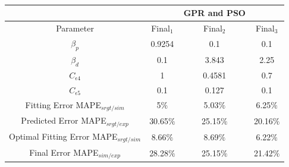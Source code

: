 \begin{minipage}{\linewidth}
	\centering
	\renewcommand\arraystretch{0.7}
	~\\
	 \label{tab:PSO table} 
	\begin{tabular}{cccc}
		\hline
		{\small } &{\small } &{GPR and PSO}\\
		\hline
		{\small Parameter} & {\small Final${_1}$} & {\small Final${_2}$} & {\small Final${_3}$}\\
		\hline
		{$\beta_{p}$} & 0.9254 & 0.1 & 0.1 \\
		{$\beta_{d}$} & 0.1 & 3.843 & 2.25 \\
		{$C_{\epsilon4}$} & 1 & 0.4581 & 0.7 \\
		{$C_{\epsilon5}$} & 0.1 & 0.127 & 0.1\\
		\hline
		{Fitting Error MAPE$_{srgt/sim}$} & 5${\%}$ & 5.03${\%}$ & 6.25${\%}$\\
		{Predicted Error MAPE$_{srgt/exp}$} & 30.65${\%}$ & 25.15${\%}$ & 20.16${\%}$\\
		{Optimal Fitting Error MAPE$_{srgt/sim}$} & 8.66${\%}$ & 8.69${\%}$ & 6.22${\%}$\\
		{Final Error MAPE$_{sim/exp}$} & 28.28${\%}$ & 25.15${\%}$ & 21.42${\%}$\\
		\hline
	\end{tabular}
\end{minipage}

